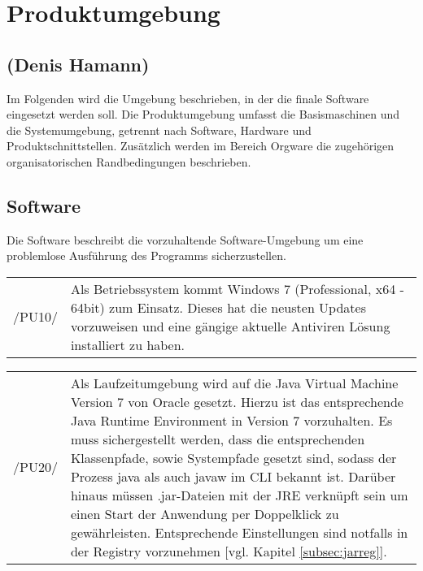 \section{Produktumgebung}
\label{sec:Produktumgebung}

\subsection*{(Denis Hamann)}

Im Folgenden wird die Umgebung beschrieben, in der die finale Software eingesetzt werden soll.
Die Produktumgebung umfasst die Basismaschinen und die Systemumgebung, getrennt nach Software, Hardware und
Produktschnittstellen. Zusätzlich werden im Bereich Orgware die zugehörigen organisatorischen Randbedingungen beschrieben.

\subsection{Software}
\label{subsec:software}

Die Software beschreibt die vorzuhaltende Software-Umgebung um eine problemlose Ausführung des Programms sicherzustellen.\\

\begin{tabular}{p{1.5cm}p{14.5cm}}

	 /PU10/	&  Als Betriebssystem kommt Windows 7 (Professional, x64 - 64bit) zum Einsatz. Dieses hat die neusten Updates vorzuweisen und eine gängige aktuelle Antiviren Lösung installiert zu haben.\\[0.25cm]

\end{tabular}

\begin{tabular}{p{1.5cm}p{14.5cm}}

	 /PU20/	&  Als Laufzeitumgebung wird auf die Java Virtual Machine Version 7 von Oracle gesetzt.
Hierzu ist das entsprechende Java Runtime Environment in Version 7 vorzuhalten. Es muss sichergestellt werden, dass die entsprechenden Klassenpfade, sowie Systempfade gesetzt sind, sodass der Prozess java als auch javaw im CLI bekannt ist. Darüber hinaus müssen .jar-Dateien mit der JRE verknüpft sein um einen Start der Anwendung per Doppelklick zu gewährleisten. Entsprechende Einstellungen sind notfalls in der Registry vorzunehmen [vgl. Kapitel \ref{subsec:jarreg}].\\[0.25cm]

\end{tabular}

